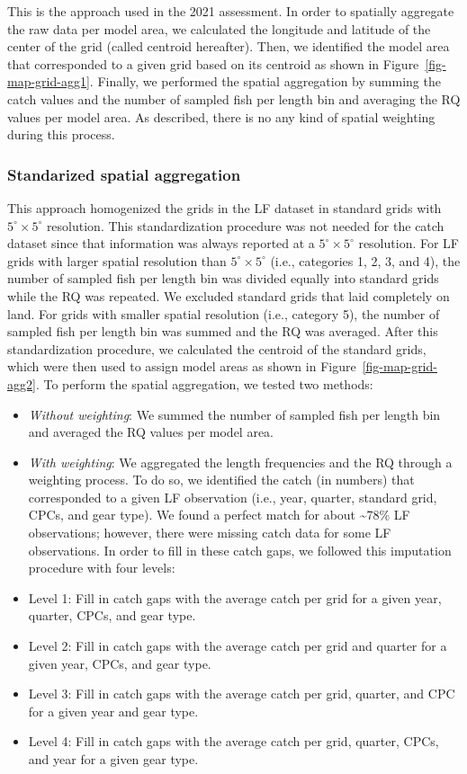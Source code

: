\documentclass[
]{scrartcl}
\begin{document}
This is the approach used in the 2021 assessment. In order to spatially
aggregate the raw data per model area, we calculated the longitude and
latitude of the center of the grid (called centroid hereafter). Then, we
identified the model area that corresponded to a given grid based on its
centroid as shown in Figure~\ref{fig-map-grid-agg1}. Finally, we
performed the spatial aggregation by summing the catch values and the
number of sampled fish per length bin and averaging the RQ values per
model area. As described, there is no any kind of spatial weighting
during this process.

\subsubsection{Standarized spatial
aggregation}\label{standarized-spatial-aggregation}

This approach homogenized the grids in the LF dataset in standard grids
with \(5^\circ\times 5^\circ\) resolution. This standardization
procedure was not needed for the catch dataset since that information
was always reported at a \(5^\circ\times 5^\circ\) resolution. For LF
grids with larger spatial resolution than \(5^\circ\times 5^\circ\)
(i.e., categories 1, 2, 3, and 4), the number of sampled fish per length
bin was divided equally into standard grids while the RQ was repeated.
We excluded standard grids that laid completely on land. For grids with
smaller spatial resolution (i.e., category 5), the number of sampled
fish per length bin was summed and the RQ was averaged. After this
standardization procedure, we calculated the centroid of the standard
grids, which were then used to assign model areas as shown in
Figure~\ref{fig-map-grid-agg2}. To perform the spatial aggregation, we
tested two methods:

\begin{itemize}
\item
  \emph{Without weighting}: We summed the number of sampled fish per
  length bin and averaged the RQ values per model area.
\item
  \emph{With weighting}: We aggregated the length frequencies and the RQ
  through a weighting process. To do so, we identified the catch (in
  numbers) that corresponded to a given LF observation (i.e., year,
  quarter, standard grid, CPCs, and gear type). We found a perfect match
  for about \textasciitilde78\% LF observations; however, there were
  missing catch data for some LF observations. In order to fill in these
  catch gaps, we followed this imputation procedure with four levels:
\item
  Level 1: Fill in catch gaps with the average catch per grid for a
  given year, quarter, CPCs, and gear type.
\item
  Level 2: Fill in catch gaps with the average catch per grid and
  quarter for a given year, CPCs, and gear type.
\item
  Level 3: Fill in catch gaps with the average catch per grid, quarter,
  and CPC for a given year and gear type.
\item
  Level 4: Fill in catch gaps with the average catch per grid, quarter,
  CPCs, and year for a given gear type.
\end{itemize}
\end{document}

